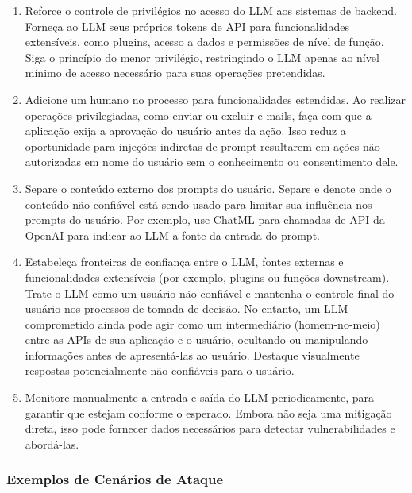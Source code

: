 \documentclass[
]{article}
\providecommand{\tightlist}{%
  \setlength{\itemsep}{0pt}\setlength{\parskip}{0pt}}
\begin{document}
\begin{enumerate}
\def\labelenumi{\arabic{enumi}.}
\tightlist
\item
  Reforce o controle de privilégios no acesso do LLM aos sistemas de
  backend. Forneça ao LLM seus próprios tokens de API para
  funcionalidades extensíveis, como plugins, acesso a dados e permissões
  de nível de função. Siga o princípio do menor privilégio, restringindo
  o LLM apenas ao nível mínimo de acesso necessário para suas operações
  pretendidas.
\item
  Adicione um humano no processo para funcionalidades estendidas. Ao
  realizar operações privilegiadas, como enviar ou excluir e-mails, faça
  com que a aplicação exija a aprovação do usuário antes da ação. Isso
  reduz a oportunidade para injeções indiretas de prompt resultarem em
  ações não autorizadas em nome do usuário sem o conhecimento ou
  consentimento dele.
\item
  Separe o conteúdo externo dos prompts do usuário. Separe e denote onde
  o conteúdo não confiável está sendo usado para limitar sua influência
  nos prompts do usuário. Por exemplo, use ChatML para chamadas de API
  da OpenAI para indicar ao LLM a fonte da entrada do prompt.
\item
  Estabeleça fronteiras de confiança entre o LLM, fontes externas e
  funcionalidades extensíveis (por exemplo, plugins ou funções
  downstream). Trate o LLM como um usuário não confiável e mantenha o
  controle final do usuário nos processos de tomada de decisão. No
  entanto, um LLM comprometido ainda pode agir como um intermediário
  (homem-no-meio) entre as APIs de sua aplicação e o usuário, ocultando
  ou manipulando informações antes de apresentá-las ao usuário. Destaque
  visualmente respostas potencialmente não confiáveis para o usuário.
\item
  Monitore manualmente a entrada e saída do LLM periodicamente, para
  garantir que estejam conforme o esperado. Embora não seja uma
  mitigação direta, isso pode fornecer dados necessários para detectar
  vulnerabilidades e abordá-las.
\end{enumerate}

\subsubsection{Exemplos de Cenários de
Ataque}\label{exemplos-de-cenuxe1rios-de-ataque}
\end{document}
